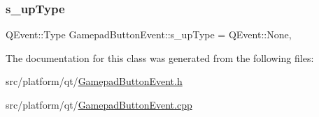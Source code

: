 \mbox{\label{class_q_g_b_a_1_1_gamepad_button_event_a65d02e8da94b30c3a2317d16a9f196d6}} 
\subsubsection{\texorpdfstring{s\+\_\+up\+Type}{s\_upType}}
{\footnotesize\ttfamily Q\+Event\+::\+Type Gamepad\+Button\+Event\+::s\+\_\+up\+Type = Q\+Event\+::\+None\hspace{0.3cm}{\ttfamily [static]}, {\ttfamily [private]}}



The documentation for this class was generated from the following files\+:\begin{DoxyCompactItemize}
\item 
src/platform/qt/\mbox{\hyperlink{_gamepad_button_event_8h}{Gamepad\+Button\+Event.\+h}}\item 
src/platform/qt/\mbox{\hyperlink{_gamepad_button_event_8cpp}{Gamepad\+Button\+Event.\+cpp}}\end{DoxyCompactItemize}
